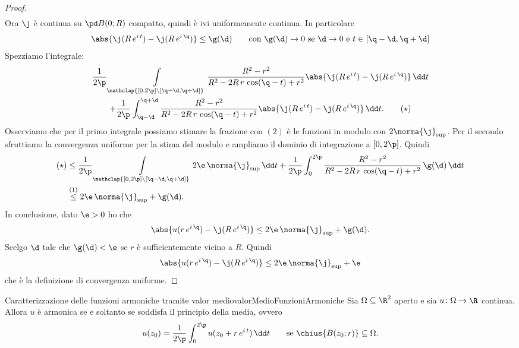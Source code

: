 \begin{proof}
\[\begin{split}
		\end{split}
	\]
	Ora \(\j\) è continua su \(\pd B(0;R)\) compatto, quindi è ivi uniformemente continua. In particolare
	\[
		\abs{\j(R\,e^{i\,t})-\j(R\,e^{i\,\q})} \le \g(\d) \qquad\text{con }\g(\d) \to 0 \text{ se }\d \to 0\text{ e }t\in[\q-\d,\q+\d]
	\]
	Spezziamo l'integrale:
	\begin{multline*}
		\frac{1}{2\p} \int\limits_{\mathclap{[0,2\p]\setminus[\q-\d,\q+\d]}} \frac{R^2-r^2}{R^2-2R\,r\,\cos(\q-t)+r^2} \abs{\j(R\,e^{i\,t})-\j(R\,e^{i\,\q})}\,\dd t\\
		+ \frac{1}{2\p} \int_{\q-\d}^{\q+\d} \frac{R^2-r^2}{R^2-2R\,r\,\cos(\q-t)+r^2} \abs{\j(R\,e^{i\,t})-\j(R\,e^{i\,\q})}\,\dd t.\tag{\(\star\)}
	\end{multline*}
	Osserviamo che per il primo integrale possiamo stimare la frazione con \((2)\) è le funzioni in modulo con \(2\norma{\j}_{\sup}\). Per il secondo sfruttiamo la convergenza uniforme per la stima del modulo e ampliamo il dominio di integrazione a \([0,2\p]\). Quindi
	\[
		\begin{split}
			(\star) & \le \frac{1}{2\p}\int\limits_{\mathclap{[0,2\p]\setminus[\q-\d,\q+\d]}} 2\e\,\norma{\j}_{\sup}\,\dd t + \frac{1}{2\p} \int_0^{2\p}\frac{R^2-r^2}{R^2-2R\,r\,\cos(\q-t)+r^2}\,\g(\d)\,\dd t\\
			& \overset{(1)}{\le} 2\e\,\norma{\j}_{\sup}+\g(\d).
		\end{split}
	\]
	In conclusione, dato \(\e>0\) ho che
	\[
		\abs{u(r\,e^{i\,\q})-\j(R\,e^{i\,\q})} \le 2\e\,\norma{\j}_{\sup}+\g(\d).
	\]
	Scelgo \(\d\) tale che \(\g(\d)<\e\) se \(r\) è sufficientemente vicino a \(R\). Quindi
	\[
		\abs{u(r\,e^{i\,\q})-\j(R\,e^{i\,\q})} \le 2\e\,\norma{\j}_{\sup}+\e
	\]
	che è la definizione di convergenza uniforme.
\end{proof}
%
%
\begin{teor}{Caratterizzazione delle funzioni armoniche tramite valor medio}{valorMedioFunzioniArmoniche}
	Sia \(\Omega \subseteq \R^2\) aperto e sia \(u\colon \Omega \to \R\) continua.
	Allora \(u\) è armonica se e soltanto se soddisfa il principio della media, ovvero
	\[
		u(z_0) = \frac{1}{2\p}\int_0^{2\p} u(z_0+r\,e^{i\,t})\,\dd t \qquad\text{se }\chius{B(z_0;r)} \subseteq \Omega.
	\]
\end{teor}

